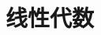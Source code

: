 \documentclass[12pt, a4paper, oneside, UTF8]{ctexbook}
\begin{document}
% 
\else
\fi
\chapter{线性代数}

\ifx\allfiles\undefined
\end{document}
